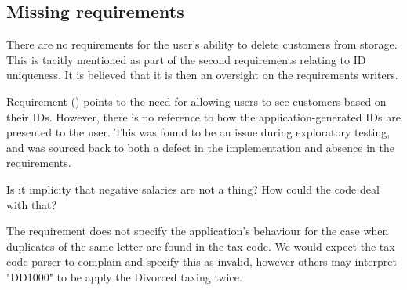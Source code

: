 
\subsection{Missing requirements}

There are no requirements for the user's ability to delete customers from storage. This is tacitly mentioned as part of the second requirements relating to ID uniqueness. It is believed that it is then an oversight on the requirements writers. 
\par
Requirement (\RFour) points to the need for allowing users to see customers based on their IDs. However, there is no reference to how the application-generated IDs are presented to the user. This was found to be an issue during exploratory testing, and was sourced back to both a defect in the implementation and absence in the requirements. 
\par
Is it implicity that negative salaries are not a thing? How could the code deal with that? 
\par
The requirement does not specify the application's behaviour for the case when duplicates of the same letter are found in the tax code. We would expect the tax code parser to complain and specify this as invalid, however others may interpret "DD1000" to be apply the Divorced taxing twice. 



% 

